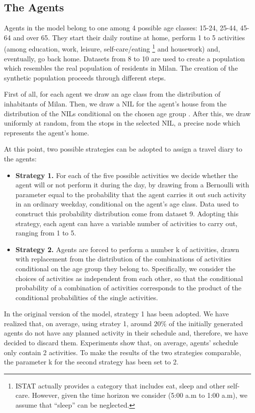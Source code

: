  \subsection{The Agents}\label{sec3}
 
Agents in the model belong to one among 4 possible age classes: 15-24, 25-44, 45-64 and over 65. They start their daily routine at home, perform 1 to 5 activities (among education, work, leisure, self-care/eating \footnote{ISTAT actually provides a category that includes eat, sleep and other self-care. However, given the time horizon we consider (5:00 a.m  to 1:00 a.m), we assume that “sleep” can be neglected.} and housework) and, eventually, go back home. Datasets from 8 to 10 are used to create a population which resembles the real population of residents in Milan.  
The creation of the synthetic population proceeds through different steps.

First of all, for each agent we draw an age class from the distribution of inhabitants of Milan. Then, we draw a NIL for the agent's house from the distribution of the NILs conditional on the chosen age group \cite{site18}. After this, we draw uniformly at random, from the stops in the selected NIL, a precise node which represents the agent’s home. 

At this point, two possible strategies can be adopted to assign a travel diary to the agents:
\begin{itemize}
    \item \textbf{Strategy 1.} For each of the five possible activities we decide whether the agent will or not perform it during the day, by drawing from a Bernoulli with parameter equal to the probability that the agent carries it out such activity in an ordinary weekday, conditional on the agent's age class. Data used to construct this probability distribution come from dataset 9. Adopting this strategy, each agent can have a variable number of activities to carry out, ranging from 1 to 5.
    \item \textbf{Strategy 2.} Agents are forced to perform a number k of activities, drawn with replacement from the distribution of the combinations of activities conditional on the age group they belong to. Specifically, we consider the choices of activities as independent from each other, so that the conditional probability of a combination of activities corresponds to the product of the conditional probabilities of the single activities.
\end{itemize}
In the original version of the model, strategy 1 has been adopted. We have realized that, on average, using stratey 1, around $20\%$ of the initially generated agents do not have any planned activity in their schedule and, therefore, we have decided to discard them. Experiments show that, on average, agents' schedule only contain 2 activities. To make the results of the two strategies comparable, the parameter k for the second strategy has been set to 2.

